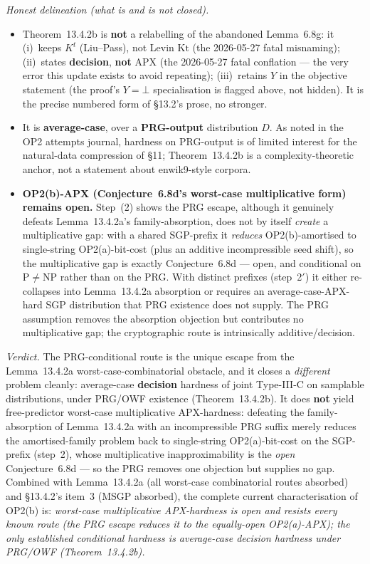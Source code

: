 \documentclass[
]{article}
\begin{document}
\emph{Honest delineation (what is and is not closed).}
\begin{itemize}
\item Theorem~13.4.2b is \textbf{not} a relabelling of the abandoned
Lemma~6.8g: it (i)~keeps $K^t$ (Liu--Pass), not Levin $\mathrm{Kt}$
(the 2026-05-27 fatal misnaming); (ii)~states \textbf{decision},
\textbf{not} APX (the 2026-05-27 fatal conflation --- the very error
this update exists to avoid repeating); (iii)~retains $Y$ in the
objective statement (the proof's $Y=\bot$ specialisation is flagged
above, not hidden). It is the precise numbered form of §13.2's prose,
no stronger.
\item It is \textbf{average-case}, over a \textbf{PRG-output}
distribution $D$. As noted in the OP2 attempts journal, hardness on
PRG-output is of limited interest for the natural-data compression of
§11; Theorem~13.4.2b is a complexity-theoretic anchor, not a statement
about enwik9-style corpora.
\item \textbf{OP2(b)-APX (Conjecture~6.8d's worst-case multiplicative
form) remains open.} Step~(2) shows the PRG escape, although it
genuinely defeats Lemma~13.4.2a's family-absorption, does not by itself
\emph{create} a multiplicative gap: with a shared SGP-prefix it
\emph{reduces} OP2(b)-amortised to single-string OP2(a)-bit-cost (plus
an additive incompressible seed shift), so the multiplicative gap is
exactly Conjecture~6.8d --- open, and conditional on
$\mathrm{P}\neq\mathrm{NP}$ rather than on the PRG. With distinct
prefixes (step~2$'$) it either re-collapses into Lemma~13.4.2a
absorption or requires an average-case-APX-hard SGP distribution that
PRG existence does not supply. The PRG assumption removes the absorption
objection but contributes no multiplicative gap; the cryptographic route
is intrinsically additive/decision.
\end{itemize}

\emph{Verdict.} The PRG-conditional route is the unique escape from the
Lemma~13.4.2a worst-case-combinatorial obstacle, and it closes a
\emph{different} problem cleanly: average-case \textbf{decision}
hardness of joint Type-III-C on samplable distributions, under PRG/OWF
existence (Theorem~13.4.2b). It does \textbf{not} yield free-predictor
worst-case multiplicative APX-hardness: defeating the family-absorption
of Lemma~13.4.2a with an incompressible PRG suffix merely reduces the
amortised-family problem back to single-string OP2(a)-bit-cost on the
SGP-prefix (step~2), whose multiplicative inapproximability is the
\emph{open} Conjecture~6.8d --- so the PRG removes one objection but
supplies no gap. Combined with Lemma~13.4.2a (all worst-case
combinatorial routes absorbed) and §13.4.2's item~3 (MSGP absorbed), the
complete current characterisation of OP2(b) is: \emph{worst-case
multiplicative APX-hardness is open and resists every known route
(the PRG escape reduces it to the equally-open OP2(a)-APX); the only
established conditional hardness is average-case decision hardness under
PRG/OWF (Theorem~13.4.2b).}
\end{document}
